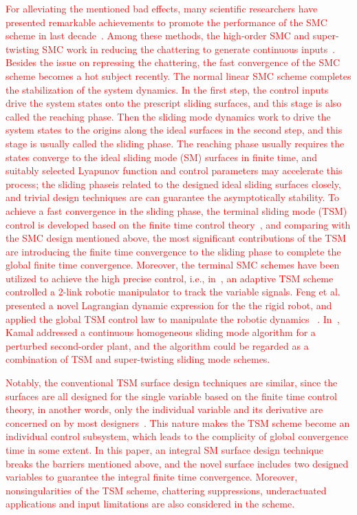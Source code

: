 \documentclass[3p]{elsarticle}
\theoremstyle{plain}
\theoremstyle{remark}
\begin{document}
\textcolor{red}{For alleviating the mentioned bad effects, many scientific researchers have presented remarkable achievements to promote the performance of the SMC scheme in last decade~\cite{zong2013quasi,santiesteban2013time,mu2015continuous,evangelista2013lyapunov,gonzalez2014chattering,dadras2012fractional,zhao2013output}. Among these methods, the high-order SMC and super-twisting SMC work in reducing the chattering to generate continuous inputs~\cite{castillo2015higher,palosz2015laser,edwards2016adaptive,zhao2015finite,liu2015second}. Besides the issue on repressing the chattering, the fast convergence of the SMC scheme becomes a hot subject recently. The normal linear SMC scheme completes the stabilization of the system dynamics. In the first step, the control inputs drive the system states onto the prescript sliding surfaces, and this stage is also called the reaching phase. Then the sliding mode dynamics work to drive the system states to the origins along the ideal surfaces in the second step, and this stage is usually called the sliding phase. The reaching phase  usually requires the states converge to the ideal sliding mode (SM) surfaces in finite time, and suitably selected Lyapunov function and control parameters may accelerate this process; the sliding phaseis related to the designed ideal sliding surfaces closely, and trivial design techniques are can guarantee the asymptotically stability. To achieve a fast convergence in the sliding phase, the terminal sliding mode (TSM) control is developed based on the finite time control theory~\cite{haimo1986finite,bhat1997finite}, and comparing with the SMC design mentioned above, the most significant contributions of the TSM are introducing the finite time convergence to the sliding phase to complete the global finite time convergence. Moreover, the terminal SMC schemes have been utilized to achieve the high precise control, i.e., in~\cite{li2015robust}, an adaptive TSM scheme controlled a $2$-link robotic manipulator to track the variable signals. Feng et al. presented a novel Lagrangian dynamic expression for the the rigid robot, and applied the global TSM control law to manipulate the robotic dynamics ~\cite{feng2002non}. In~\cite{kamal2016continuous}, Kamal addressed a continuous homogeneous sliding mode algorithm for a perturbed second-order plant, and the algorithm could be regarded as a combination of TSM and super-twisting sliding mode schemes.}

\textcolor{red}{Notably, the conventional TSM surface design techniques are similar, since the surfaces are all designed for the single variable based on the finite time control theory, in another words, only the individual variable and its derivative are concerned on by most designers~\cite{mu2016switching}. This nature makes the TSM scheme become an individual control subsystem, which leads to the complicity of global convergence time in some extent. In this paper, an integral SM surface design technique breaks the barriers mentioned above, and the novel surface includes two designed variables to guarantee the integral finite time convergence. Moreover, nonsingularities of the TSM scheme, chattering suppressions, underactuated applications and input limitations are also considered in the scheme.}
\end{document}
